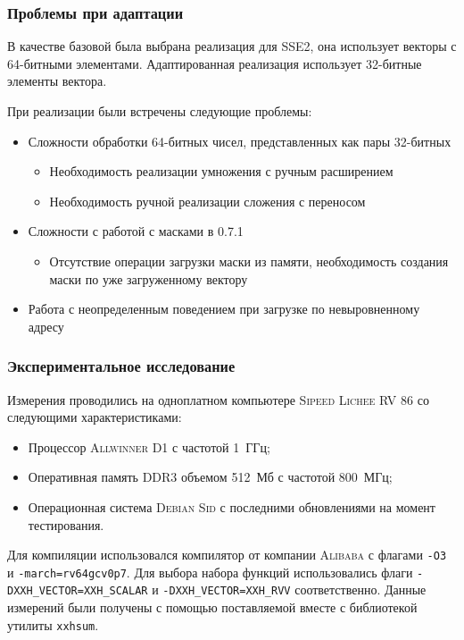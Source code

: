 \documentclass[aspectratio=169]{beamer}
\begin{document}
\begin{frame}[t]
	\frametitle{Проблемы при адаптации}
	В качестве базовой была выбрана реализация для SSE2, она использует векторы с 64-битными элементами.
	Адаптированная реализация использует 32-битные элементы вектора.

	При реализации были встречены следующие проблемы:
	\begin{itemize}
		\item Сложности обработки 64-битных чисел, представленных как пары 32-битных
		      \begin{itemize}
			      \item Необходимость реализации умножения с ручным расширением
			      \item Необходимость ручной реализации сложения с переносом
		      \end{itemize}
		\item Сложности с работой с масками в \rvv{} 0.7.1
		      \begin{itemize}
			      \item Отсутствие операции загрузки маски из памяти, необходимость создания маски по уже загруженному вектору
		      \end{itemize}
		\item Работа с неопределенным поведением при загрузке по невыровненному адресу
	\end{itemize}
\end{frame}

\begin{frame}
	\frametitle{Экспериментальное исследование}
	Измерения проводились на одноплатном компьютере \textsc{Sipeed Lichee RV 86} со следующими характеристиками:
	\begin{itemize}
		\item Процессор \textsc{Allwinner D1} с частотой 1~ГГц;
		\item Оперативная память \textsc{DDR3} объемом 512~Мб с частотой 800~МГц;
		\item Операционная система \textsc{Debian Sid} с последними обновлениями на момент тестирования.
	\end{itemize}

	Для компиляции использовался компилятор от компании \textsc{Alibaba} с флагами \texttt{-O3} и \texttt{-march=rv64gcv0p7}.
	Для выбора набора функций использовались флаги \texttt{-DXXH\_VECTOR=XXH\_SCALAR} и \texttt{-DXXH\_VECTOR=XXH\_RVV} соответственно.
	Данные измерений были получены с помощью поставляемой вместе с библиотекой утилиты \texttt{xxhsum}.
\end{frame}
\end{document}
